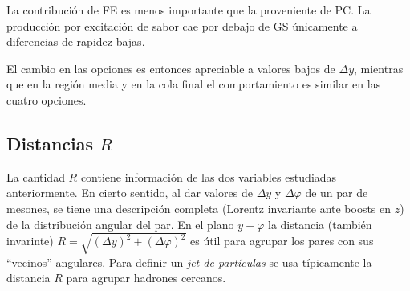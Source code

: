 La contribución de FE es menos importante que la proveniente de PC. La producción por excitación de sabor cae por debajo de GS únicamente a diferencias de rapidez bajas.

El cambio en las opciones es entonces apreciable a valores bajos de $\Delta y$, mientras que en la región media y en la cola final el comportamiento es similar en las cuatro opciones.

\subsection{Distancias $R$}

La cantidad $R$ contiene información de las dos variables estudiadas anteriormente. En cierto sentido, al dar valores de $\Delta y$ y $\Delta \varphi$ de un par de mesones, se tiene una descripción completa (Lorentz invariante ante boosts en $z$) de la distribución angular del par. En el plano $y - \varphi$ la distancia (también invarinte) $R=\sqrt{(\Delta y)^2 + (\Delta \varphi)^2}$ es útil para agrupar los pares con sus ``vecinos'' angulares. Para definir un \textit{jet de partículas} se usa típicamente la distancia $R$ para agrupar hadrones cercanos.

